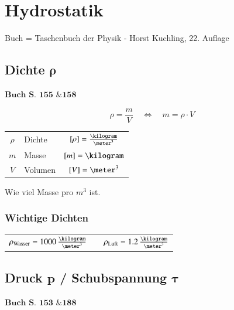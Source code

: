 \section{Hydrostatik}
Buch = Taschenbuch der Physik - Horst Kuchling, 22. Auflage

\subsection[Dichte]{Dichte $\bm{\rho}$}
\begin{flushright}
	$\boxed{\textbf{Buch S. 155 \& 158 }}$
\end{flushright}

\hspace*{\fill}
\begin{minipage}[c]{0.48\columnwidth}
	$$ \boxed{ \rho = \frac{m}{V} \quad \Leftrightarrow \quad m = \rho \cdot V } $$	 
\end{minipage}
\hfill
\begin{minipage}[c]{0.48\columnwidth}
	\begin{tabular}{c l c}
		$\rho$  & Dichte    & $[\rho] = \frac{\kilogram}{\meter^3}$ \\
		$m$     & Masse     & $[m] = \kilogram$                     \\
		$V$     & Volumen   & $[V] = \meter^3$
	\end{tabular}
\end{minipage}

\vspace{0.2cm}

Wie viel Masse pro $m^3$ ist.

\subsubsection{Wichtige Dichten}	

\begin{tabular}{l c l}
	$\rho_{\rm Wasser} = 1000 \, \frac{\kilogram}{\meter^3}$    & &  $\rho_{\rm Luft} = 1.2 \, \frac{\kilogram}{\meter^3}$
	
\end{tabular}


\subsection[Druck / Schubspannung]{Druck $\bm{p}$ / Schubspannung $\bm{\tau}$}

\begin{flushright}
	$\boxed{\textbf{Buch S. 153 \& 188}}$
\end{flushright}


